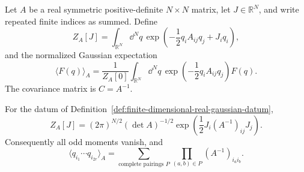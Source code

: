 \begin{definition}
\label{def:finite-dimensional-real-gaussian-datum}
Let \(A\) be a real symmetric positive-definite \(N\times N\) matrix, let
\(J\in\mathbb R^N\), and write repeated finite indices as summed.  Define
\[
  Z_A[J]
  =
  \int_{\mathbb R^N}\dd^Nq\,
  \exp\left(
    -\frac12q_iA_{ij}q_j+J_iq_i
  \right),
\]
and the normalized Gaussian expectation
\[
  \langle F(q)\rangle_A
  =
  \frac{1}{Z_A[0]}
  \int_{\mathbb R^N}\dd^Nq\,
  \exp\left(-\frac12q_iA_{ij}q_j\right)F(q).
\]
The covariance matrix is \(C=A^{-1}\).
\end{definition}

\begin{proposition}
\label{prop:finite-dimensional-gaussian-wick-theorem}
For the datum of Definition~\ref{def:finite-dimensional-real-gaussian-datum},
\[
  Z_A[J]
  =
  (2\pi)^{N/2}(\det A)^{-1/2}
  \exp\left(
    \frac12J_i(A^{-1})_{ij}J_j
  \right).
\]
Consequently all odd moments vanish, and
\[
  \langle q_{i_1}\cdots q_{i_{2r}}\rangle_A
  =
  \sum_{\text{complete pairings }P}
  \prod_{(a,b)\in P}(A^{-1})_{i_ai_b}.
\]
\end{proposition}

